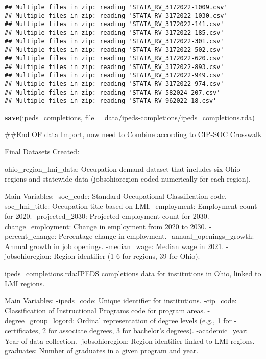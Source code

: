 \documentclass[
]{article}
\newenvironment{Shaded}{\begin{snugshade}}{\end{snugshade}}
\newcommand{\AttributeTok}[1]{\textcolor[rgb]{0.13,0.29,0.53}{#1}}
\newcommand{\FunctionTok}[1]{\textcolor[rgb]{0.13,0.29,0.53}{\textbf{#1}}}
\newcommand{\NormalTok}[1]{#1}
\newcommand{\StringTok}[1]{\textcolor[rgb]{0.31,0.60,0.02}{#1}}
\begin{document}
\begin{verbatim}
## Multiple files in zip: reading 'STATA_RV_3172022-1009.csv'
## Multiple files in zip: reading 'STATA_RV_3172022-1030.csv'
## Multiple files in zip: reading 'STATA_RV_3172022-141.csv'
## Multiple files in zip: reading 'STATA_RV_3172022-185.csv'
## Multiple files in zip: reading 'STATA_RV_3172022-301.csv'
## Multiple files in zip: reading 'STATA_RV_3172022-502.csv'
## Multiple files in zip: reading 'STATA_RV_3172022-620.csv'
## Multiple files in zip: reading 'STATA_RV_3172022-893.csv'
## Multiple files in zip: reading 'STATA_RV_3172022-949.csv'
## Multiple files in zip: reading 'STATA_RV_3172022-974.csv'
## Multiple files in zip: reading 'STATA_RV_582024-207.csv'
## Multiple files in zip: reading 'STATA_RV_962022-18.csv'
\end{verbatim}

\begin{Shaded}
\begin{Highlighting}[]
\FunctionTok{save}\NormalTok{(ipeds\_completions, }\AttributeTok{file =} \StringTok{\textquotesingle{}data/ipeds{-}completions/ipeds\_completions.rda\textquotesingle{}}\NormalTok{)}
\end{Highlighting}
\end{Shaded}

\#\#End OF data Import, now need to Combine according to CIP-SOC
Crosswalk

Final Datasets Created:

ohio\_region\_lmi\_data: Occupation demand dataset that includes six
Ohio regions and statewide data (jobsohioregion coded numerically for
each region).

Main Variables: -soc\_code: Standard Occupational Classification code.
-soc\_lmi\_title: Occupation title based on LMI. -employment: Employment
count for 2020. -projected\_2030: Projected employment count for 2030.
-change\_employment: Change in employment from 2020 to 2030.
-percent\_change: Percentage change in employment.
-annual\_openings\_growth: Annual growth in job openings. -median\_wage:
Median wage in 2021. -jobsohioregion: Region identifier (1-6 for
regions, 39 for Ohio).

ipeds\_completions.rda:IPEDS completions data for institutions in Ohio,
linked to LMI regions.

Main Variables: -ipeds\_code: Unique identifier for institutions.
-cip\_code: Classification of Instructional Programs code for program
areas. -degree\_group\_logord: Ordinal representation of degree levels
(e.g., 1 for -certificates, 2 for associate degrees, 3 for bachelor's
degrees). -academic\_year: Year of data collection. -jobsohioregion:
Region identifier linked to LMI regions. -graduates: Number of graduates
in a given program and year.
\end{document}
